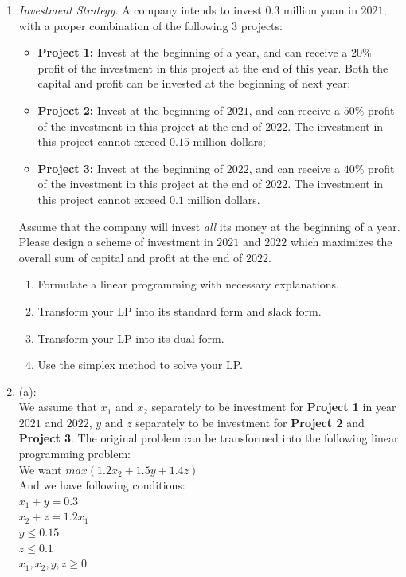 \documentclass[12pt,a4paper]{article}
\makeatletter
\newtheorem*{solution}{Solution}
\theoremstyle{definition}
\renewenvironment{solution}[1][Solution] {\par\pushQED{\qed}\normalfont\topsep6\p@\@plus6\p@\relax\trivlist\item[\hskip\labelsep\bfseries#1\@addpunct{.}]\ignorespaces}{\popQED\endtrivlist\@endpefalse} \makeatother
\makeatother
\begin{document}
\begin{enumerate}
    
    
    
    \item
    \textit{Investment Strategy.} A company intends to invest $0.3$ million yuan in $2021$, with a proper combination of the following $3$ projects:
    \begin{itemize}
    \item \textbf{Project 1:} Invest at the beginning of a year, and can receive a $20\%$ profit of the investment in this project at the end of this year. Both the capital and profit can be invested at the beginning of next year;
    \item \textbf{Project 2:} Invest at the beginning of $2021$, and can receive a $50\%$ profit of the investment in this project at the end of $2022$. The investment in this project cannot exceed $0.15$ million dollars;
    \item \textbf{Project 3:} Invest at the beginning of $2022$, and can receive a $40\%$ profit of the investment in this project at the end of $2022$. The investment in this project cannot exceed $0.1$ million dollars.
    \end{itemize}
    Assume that the company will invest \emph{all} its money at the beginning of a year. Please design a scheme of investment in $2021$ and $2022$ which maximizes the overall sum of capital and profit at the end of $2022$.
    \begin{enumerate}
    \item
    Formulate a linear programming with necessary explanations.

    \item
    Transform your LP into its standard form and slack form.

    \item
    Transform your LP into its dual form.

    \item
    Use the simplex method to solve your LP.
    \end{enumerate}
    
    \begin{solution}
    (a):\\
    We assume that $x_1$ and $x_2$ separately to be investment for \textbf{Project 1} in year $2021$ and $2022$, $y$ and $z$ separately to be investment for \textbf{Project 2} and \textbf{Project 3}. The original problem can be transformed into the following linear programming problem: \\
    We want $max\left(1.2x_2+1.5y+1.4z\right)$\\
    And we have following conditions: \\
    $x_1+y = 0.3$\\
    $x_2+z = 1.2x_1$\\
    $y \leq 0.15$\\
    $z \leq 0.1$\\
    $x_1,x_2,y,z \ge 0$\\
    

\end{solution}
\end{enumerate}
\end{document}
